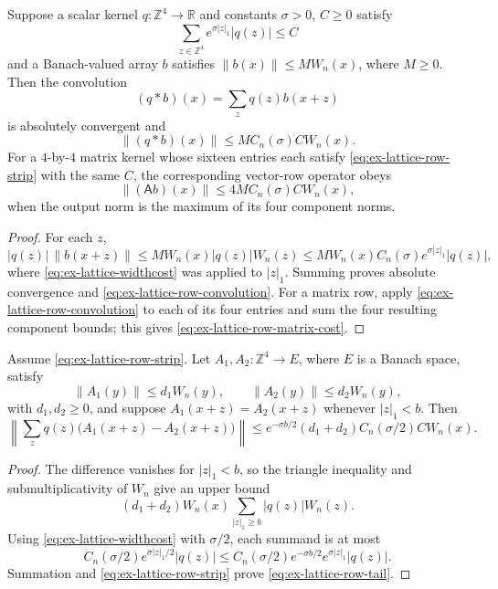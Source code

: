 \begin{lemma}
\label{lem:ex-lattice-row-convolution}
Suppose a scalar kernel \(q:\mathbb Z^4\to\mathbb R\) and constants
\(\sigma>0\), \(C\ge0\) satisfy
\begin{equation}
 \sum_{z\in\mathbb Z^4}e^{\sigma|z|_1}|q(z)|\le C
 \label{eq:ex-lattice-row-strip}
 \end{equation}
and a Banach-valued array \(b\) satisfies
\(\|b(x)\|\le M W_n(x)\), where \(M\ge0\). Then the convolution
\[
 (q*b)(x)=\sum_z q(z)b(x+z)
 \]
is absolutely convergent and
\begin{equation}
 \|(q*b)(x)\|\le
 M C_n(\sigma) C W_n(x).
 \label{eq:ex-lattice-row-convolution}
 \end{equation}
For a \(4\)-by-\(4\) matrix kernel whose sixteen entries each satisfy
\eqref{eq:ex-lattice-row-strip} with the same \(C\), the corresponding vector-row operator obeys
\begin{equation}
 \|(\mathsf A b)(x)\|\le
 4M C_n(\sigma) C W_n(x),
 \label{eq:ex-lattice-row-matrix-cost}
 \end{equation}
when the output norm is the maximum of its four component norms.
\end{lemma}
\begin{proof}
For each \(z\),
\[
 |q(z)|\,\|b(x+z)\|
 \le M W_n(x)|q(z)|W_n(z)
 \le M W_n(x)C_n(\sigma)e^{\sigma|z|_1}|q(z)|,
 \]
where \eqref{eq:ex-lattice-widthcost} was applied to \(|z|_1\). Summing proves absolute convergence and
\eqref{eq:ex-lattice-row-convolution}. For a matrix row, apply \eqref{eq:ex-lattice-row-convolution} to each of its four entries and sum the
four resulting component bounds; this gives \eqref{eq:ex-lattice-row-matrix-cost}.
\end{proof}

\begin{lemma}
\label{lem:ex-lattice-row-tail}
Assume \eqref{eq:ex-lattice-row-strip}. Let \(A_1,A_2:\mathbb Z^4\to E\), where \(E\) is a Banach
space, satisfy
\[
 \|A_1(y)\|\le d_1W_n(y),\qquad
 \|A_2(y)\|\le d_2W_n(y),
 \]
with \(d_1,d_2\ge0\), and suppose \(A_1(x+z)=A_2(x+z)\) whenever
\(|z|_1<b\). Then
\begin{equation}
 \left\|\sum_z q(z)\bigl(A_1(x+z)-A_2(x+z)\bigr)\right\|
 \le e^{-\sigma b/2}(d_1+d_2)C_n(\sigma/2)C W_n(x).
 \label{eq:ex-lattice-row-tail}
 \end{equation}
\end{lemma}
\begin{proof}
The difference vanishes for \(|z|_1<b\), so the triangle inequality and
submultiplicativity of \(W_n\) give an upper bound
\[
 (d_1+d_2)W_n(x)\sum_{|z|_1\ge b}|q(z)|W_n(z).
 \]
Using \eqref{eq:ex-lattice-widthcost} with \(\sigma/2\), each summand is at most
\[
 C_n(\sigma/2)e^{\sigma|z|_1/2}|q(z)|
 \le C_n(\sigma/2)e^{-\sigma b/2}
       e^{\sigma|z|_1}|q(z)|.
 \]
Summation and \eqref{eq:ex-lattice-row-strip} prove \eqref{eq:ex-lattice-row-tail}.
\end{proof}


